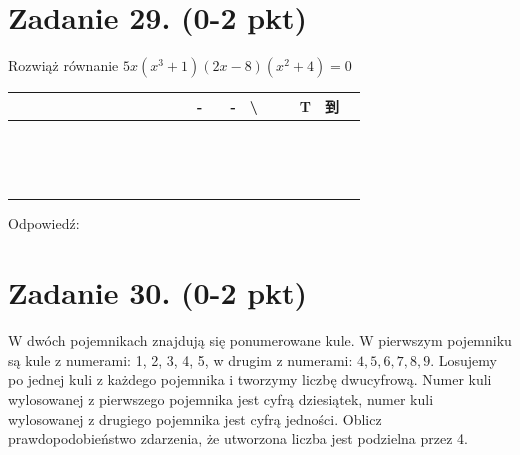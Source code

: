 \documentclass[10pt]{article}
\begin{document}
\section*{Zadanie 29. (0-2 pkt)}
Rozwiąż równanie \(5 x\left(x^{3}+1\right)(2 x-8)\left(x^{2}+4\right)=0\)

\begin{center}
\begin{tabular}{|c|c|c|c|c|c|c|c|c|c|c|c|c|c|c|c|c|c|c|c|c|c|}
\hline
 &  &  &  &  &  &  &  &  &  &  &  &  & - &  & - & \textbackslash  &  &  & T & 到 &  \\
\hline
 &  &  &  &  &  &  &  &  &  &  &  &  &  &  &  &  &  &  &  &  &  \\
\hline
 &  &  &  &  &  &  &  &  &  &  &  &  &  &  &  &  &  &  &  &  &  \\
\hline
 &  &  &  &  &  &  &  &  &  &  &  &  &  &  &  &  &  &  &  &  &  \\
\hline
 &  &  &  &  &  &  &  &  &  &  &  &  &  &  &  &  &  &  &  &  &  \\
\hline
 &  &  &  &  &  &  &  &  &  &  &  &  &  &  &  &  &  &  &  &  &  \\
\hline
 &  &  &  &  &  &  &  &  &  &  &  &  &  &  &  &  &  &  &  &  &  \\
\hline
 &  &  &  &  &  &  &  &  &  &  &  &  &  &  &  &  &  &  &  &  &  \\
\hline
 &  &  &  &  &  &  &  &  &  &  &  &  &  &  &  &  &  &  &  &  &  \\
\hline
 &  &  &  &  &  &  &  &  &  &  &  &  &  &  &  &  &  &  &  &  &  \\
\hline
 &  &  &  &  &  &  &  &  &  &  &  &  &  &  &  &  &  &  &  &  &  \\
\hline
 &  &  &  &  &  &  &  &  &  &  &  &  &  &  &  &  &  &  &  &  &  \\
\hline
 &  &  &  &  &  &  &  &  &  &  &  &  &  &  &  &  &  &  &  &  &  \\
\hline
 &  &  &  &  &  &  &  &  &  &  &  &  &  &  &  &  &  &  &  &  &  \\
\hline
 &  &  &  &  &  &  &  &  &  &  &  &  &  &  &  &  &  &  &  &  &  \\
\hline
 &  &  &  &  &  &  &  &  &  &  &  &  &  &  &  &  &  &  &  &  &  \\
\hline
\end{tabular}
\end{center}

Odpowiedź:

\section*{Zadanie 30. (0-2 pkt)}
W dwóch pojemnikach znajdują się ponumerowane kule. W pierwszym pojemniku są kule z numerami: 1, 2, 3, 4, 5, w drugim z numerami: \(4,5,6,7,8,9\). Losujemy po jednej kuli z każdego pojemnika i tworzymy liczbę dwucyfrową. Numer kuli wylosowanej z pierwszego pojemnika jest cyfrą dziesiątek, numer kuli wylosowanej z drugiego pojemnika jest cyfrą jedności. Oblicz prawdopodobieństwo zdarzenia, że utworzona liczba jest podzielna przez 4.
\end{document}
